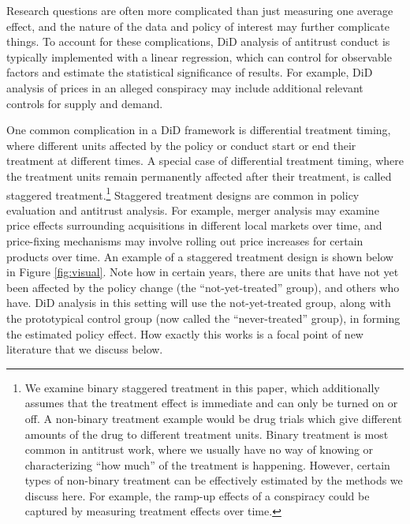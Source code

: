 \documentclass[12pt]{article}
\begin{document}
Research questions are often more complicated than just measuring one average effect, and the nature of the data and policy of interest may further complicate things. To account for these complications, DiD analysis of antitrust conduct is typically implemented with a linear regression, which can control for observable factors and estimate the statistical significance of results. For example, DiD analysis of prices in an alleged conspiracy may include additional relevant controls for supply and demand.

One common complication in a DiD framework is differential treatment timing, where different units affected by the policy or conduct start or end their treatment at different times. A special case of differential treatment timing, where the treatment units remain permanently affected after their treatment, is called staggered treatment.\footnote{We examine binary staggered treatment in this paper, which additionally assumes that the treatment effect is immediate and can only be turned on or off. A non-binary treatment example would be drug trials which give different amounts of the drug to different treatment units. Binary treatment is most common in antitrust work, where we usually have no way of knowing or characterizing “how much” of the treatment is happening. However, certain types of non-binary treatment can be effectively estimated by the methods we discuss here. For example, the ramp-up effects of a conspiracy could be captured by measuring treatment effects over time.}  Staggered treatment designs are common in policy evaluation and antitrust analysis. For example, merger analysis may examine price effects surrounding acquisitions in different local markets over time, and price-fixing mechanisms may involve rolling out price increases for certain products over time. An example of a staggered treatment design is shown below in Figure \ref{fig:visual}. Note how in certain years, there are units that have not yet been affected by the policy change (the “not-yet-treated” group), and others who have. DiD analysis in this setting will use the not-yet-treated group, along with the prototypical control group (now called the “never-treated” group), in forming the estimated policy effect. How exactly this works is a focal point of new literature that we discuss below.
\end{document}
